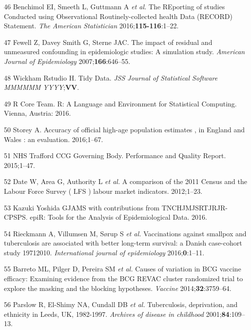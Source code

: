 \documentclass[11pt,twoside]{bristolthesis}
\begin{document}
  \leavevmode\hypertarget{ref-Benchimol2016a}{}%
  46 Benchimol EI, Smeeth L, Guttmann A \emph{et al.} The REporting of studies Conducted using Observational Routinely-collected health Data (RECORD) Statement. \emph{The American Statistician} 2016;\textbf{115-116}:1--22.
  
  \leavevmode\hypertarget{ref-Fewell2007}{}%
  47 Fewell Z, Davey Smith G, Sterne JAC. The impact of residual and unmeasured confounding in epidemiologic studies: A simulation study. \emph{American Journal of Epidemiology} 2007;\textbf{166}:646--55.
  
  \leavevmode\hypertarget{ref-Wickham2015}{}%
  48 Wickham Rstudio H. Tidy Data. \emph{JSS Journal of Statistical Software MMMMMM YYYY};\textbf{VV}.
  
  \leavevmode\hypertarget{ref-R}{}%
  49 R Core Team. R: A Language and Environment for Statistical Computing. Vienna, Austria: 2016.
  
  \leavevmode\hypertarget{ref-storey2016}{}%
  50 Storey A. Accuracy of official high-age population estimates , in England and Wales : an evaluation. 2016;1--67.
  
  \leavevmode\hypertarget{ref-NHSTraffordCCGGoverningBody2015}{}%
  51 NHS Trafford CCG Governing Body. Performance and Quality Report. 2015;1--47.
  
  \leavevmode\hypertarget{ref-Date2012}{}%
  52 Date W, Area G, Authority L \emph{et al.} A comparison of the 2011 Census and the Labour Force Survey ( LFS ) labour market indicators. 2012;1--23.
  
  \leavevmode\hypertarget{ref-Stevenson2016}{}%
  53 Kazuki Yoshida GJAMS with contributions from TNCHJMJSRTJRJR-CPSPS. epiR: Tools for the Analysis of Epidemiological Data. 2016.
  
  \leavevmode\hypertarget{ref-Rieckmann2016}{}%
  54 Rieckmann A, Villumsen M, Sørup S \emph{et al.} Vaccinations against smallpox and tuberculosis are associated with better long-term survival: a Danish case-cohort study 19712010. \emph{International journal of epidemiology} 2016;\textbf{0}:1--11.
  
  \leavevmode\hypertarget{ref-Barreto2014a}{}%
  55 Barreto ML, Pilger D, Pereira SM \emph{et al.} Causes of variation in BCG vaccine efficacy: Examining evidence from the BCG REVAC cluster randomized trial to explore the masking and the blocking hypotheses. \emph{Vaccine} 2014;\textbf{32}:3759--64.
  
  \leavevmode\hypertarget{ref-Parslow2001}{}%
  56 Parslow R, El-Shimy NA, Cundall DB \emph{et al.} Tuberculosis, deprivation, and ethnicity in Leeds, UK, 1982-1997. \emph{Archives of disease in childhood} 2001;\textbf{84}:109--13.
  
\end{document}
